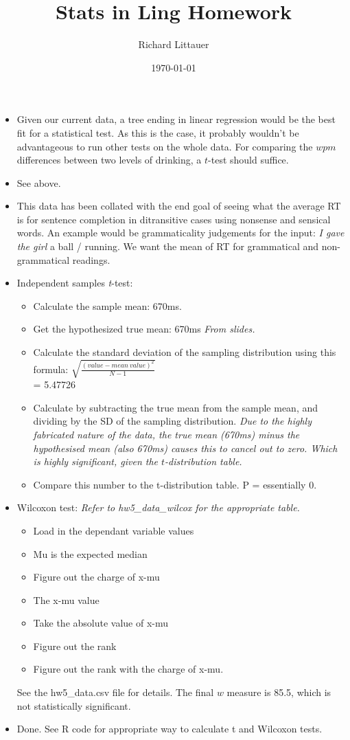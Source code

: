 \documentclass[11pt]{article}
\title{Stats in Ling Homework}
\author{Richard Littauer}
\date{\today}                          		%
\newenvironment{itemise}{
\begin{itemize}
  \setlength{\itemsep}{1pt}
  \setlength{\parskip}{0pt}
  \setlength{\parsep}{0pt}
}{\end{itemize}}
\begin{document}
\maketitle

\begin{itemise}
\item Given our current data, a tree ending in linear regression would be the best fit for a statistical test. As this is the case, it probably wouldn't be advantageous to run other tests on the whole data. For comparing the $wpm$ differences between two levels of drinking, a $t$-test should suffice. 
\item See above.
\item This data has been collated with the end goal of seeing what the average RT is for sentence completion in ditransitive cases using nonsense and sensical words. An example would be grammaticality judgements for the input: {\it I gave the girl} a ball / running. We want the mean of RT for grammatical and non-grammatical readings.
\item Independent samples {\it t}-test:
\begin{itemise}
\item Calculate the sample mean: 670ms.
\item Get the hypothesized true mean: 670ms {\it From slides.}
\item Calculate the standard deviation of the sampling distribution using this formula: $\sqrt{\frac{(value -mean\ value)^2}{N-1}}$ \\
 = 5.47726
\item Calculate by subtracting the true mean from the sample mean, and dividing by the SD of the sampling distribution. {\it Due to the highly fabricated nature of the data, the true mean (670ms) minus the hypothesised mean (also 670ms) causes this to cancel out to zero. Which is highly significant, given the $t$-distribution table.}
\item Compare this number to the t-distribution table. P = essentially 0. 
\end{itemise}
\item Wilcoxon test: {\it Refer to hw5\_data\_wilcox for the appropriate table.}
\begin{itemise}
\item Load in the dependant variable values
\item Mu is the expected median
\item Figure out the charge of x-mu
\item The x-mu value 
\item Take the absolute value of x-mu
\item Figure out the rank
\item Figure out the rank with the charge of x-mu.
\end{itemise}
See the hw5\_data.csv file for details. The final $w$ measure is 85.5, which is not statistically significant. 
\item Done. See R code for appropriate way to calculate t and Wilcoxon tests.  
\end{itemise}





















%
%
\end{document}

